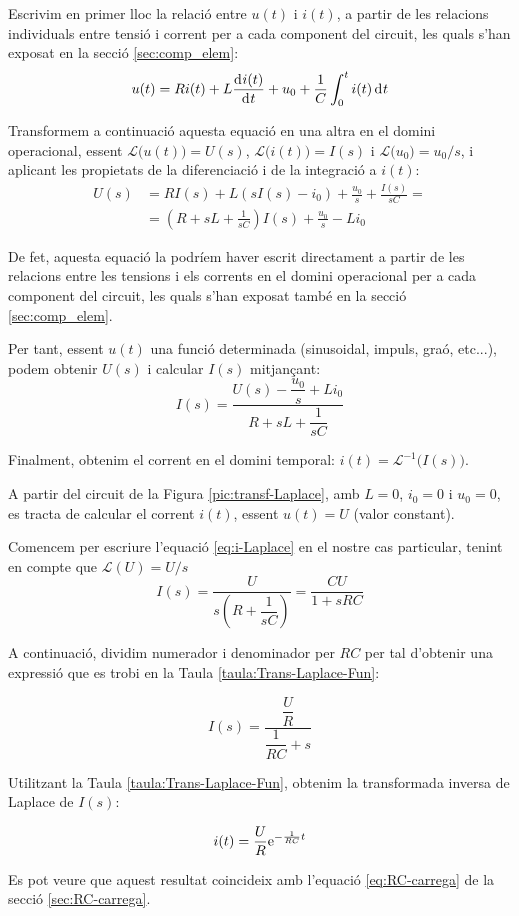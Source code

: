 Escrivim en primer lloc  la relació entre $u(t)$ i $i(t)$, a partir
de les relacions individuals entre tensió i corrent per a cada
component del circuit, les quals s'han exposat en la secció
\vref{sec:comp_elem}:
\begin{equation}
    u(t) = R i(t) + L \frac{\diff i(t)}{\diff t} + u_0 + \frac{1}{C}
    \int_0^t i(t) \diff t
\end{equation}

Transformem a continuació aquesta equació en una altra en el domini
operacional, essent $\mathcal{L}\bigl(u(t)\bigr) = U(s)$,
$\mathcal{L}\bigl(i(t)\bigr) = I(s)$ i $\mathcal{L}\bigl(u_0\bigr) =
u_0/s$, i aplicant les propietats de la diferenciació i de la
integració a $i(t)$:
\begin{equation}\begin{split}
    U(s) &= R I(s) + L(s I(s) -i_0) + \frac{u_0}{s} + \frac{I(s)}{s
    C} =\\[1ex]
    &= \left( R + s L +\frac{1}{s C}\right)I(s) + \frac{u_0}{s} - L i_0
\end{split}\end{equation}

De fet, aquesta equació la podríem haver escrit directament a
partir de les relacions entre les tensions i els corrents en el
domini operacional per a cada  component del circuit, les quals
s'han exposat també en la secció \vref{sec:comp_elem}.

Per tant, essent $u(t)$  una funció determinada (sinusoidal, impuls,
graó, etc...), podem obtenir $U(s)$ i calcular $I(s)$ mitjançant:
\begin{equation}
    I(s) = \frac{U(s)-\dfrac{u_0}{s} + L i_0}{R + s L
    +\dfrac{1}{s C}}\label{eq:i-Laplace}
\end{equation}

Finalment, obtenim el corrent en el domini temporal: $i(t) =
\mathcal{L}^{-1}\bigl(I(s)\bigr)$.


\begin{exemple}
    A partir del circuit de la Figura \vref{pic:transf-Laplace}, amb
    $L=0$, $i_0=0$ i $u_0=0$, es tracta de calcular el corrent $i(t)$,
    essent $u(t)=U$ (valor constant).

    Comencem per escriure l'equació \eqref{eq:i-Laplace} en el nostre
    cas particular, tenint en compte que $\mathcal{L}(U) = U/s$
    \[
        I(s) = \frac{U}{s\left(R + \dfrac{1}{s C}\right)} = \frac{C U}{1 + s R C}
    \]

    A continuació, dividim numerador i denominador per $R C$ per tal
    d'obtenir una expressió que es trobi en la Taula
    \vref{taula:Trans-Laplace-Fun}:

    \[
        I(s) = \frac{\dfrac{U}{R}}{\dfrac{1}{R C} + s}
    \]

    Utilitzant la Taula \vref{taula:Trans-Laplace-Fun}, obtenim la transformada inversa de Laplace de $I(s)$:

    \[
        i(t) = \frac{U}{R} \mathrm{e}^{-\frac{1}{R C}t}
    \]

    Es pot veure que aquest resultat coincideix amb l'equació \eqref{eq:RC-carrega} de la secció \vref{sec:RC-carrega}.
\end{exemple}

